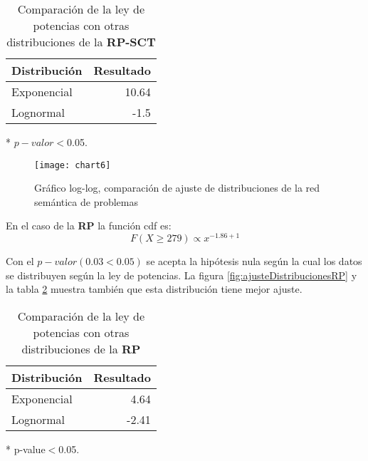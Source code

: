 \begin{table}[htb]
\centering
\caption{Comparación de la ley de potencias con otras distribuciones de la \textbf{\acrshort{RP-SCT}}}
\label{distribucionRPSCT}
\begin{threeparttable}
\begin{tabular}{@{}lr@{}}
\toprule
Distribución & Resultado    \\ \midrule
Exponencial  & 10.64\tnote{*}  \\
Lognormal    & -1.5 \\ \bottomrule
\end{tabular}
\begin{tablenotes}
    \item[*] $p-valor<$\num{0.05}.
  \end{tablenotes}
\end{threeparttable}
\end{table}

\begin{figure}[ht]
\caption{Gráfico log-log, comparación de ajuste de distribuciones de la red semántica de problemas}
\label{fig:ajusteDistribuciones}
\centering
\texttt{[image: chart6]}
\end{figure}

En el caso de la \textbf{\acrshort{RP}} la función \acrshort{cdf}  es:
\begin{equation}
F(X\geq 279) \propto x^{-1.86 +1}
\end{equation}

Con el $p-valor(0.03<0.05)$ se acepta la hipótesis nula según la cual los datos se distribuyen según la ley de potencias. La figura \ref{fig:ajusteDistribucionesRP} y la tabla \ref{distribucionRP} muestra también que esta distribución tiene mejor ajuste.

\begin{table}[htb]
\centering
\caption{Comparación de la ley de potencias con otras distribuciones de la \textbf{\acrshort{RP}}}
\label{distribucionRP}
\begin{threeparttable}
\begin{tabular}{@{}lr@{}}
\toprule
Distribución & Resultado    \\ \midrule
Exponencial  & 4.64\tnote{*}  \\
Lognormal    & -2.41 \\ \bottomrule
\end{tabular}
\begin{tablenotes}
    \item[*] p-value$<$\num{0.05}.
  \end{tablenotes}
\end{threeparttable}
\end{table}

